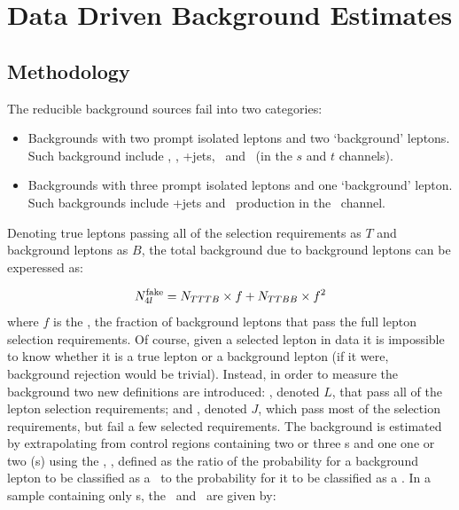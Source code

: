 \section{Data Driven Background Estimates}

\label{sec:ddbg}

\subsection{Methodology}

The reducible background sources fail into two categories:

\begin{itemize}
\item Backgrounds with two prompt isolated leptons and two `background' leptons. Such
background include \ZX, \Zgamma, \WW+jets, \ttbar\ and \singletop\ (in the
$s$ and $t$ channels).
\item Backgrounds with three prompt isolated leptons and one `background'
lepton. Such backgrounds include \WZ+jets and \singletop\ production in the \Wt\
channel.
\end{itemize}

Denoting true leptons passing all of the selection requirements as $T$ and
background leptons as $B$, the total background due to background leptons can be
experessed as:

\begin{equation}
N_{4l}^{\rm fake} = N_{TTTB} \times f + N_{TTBB} \times f^{2}
\label{eqn:bg-4l-true}
\end{equation}
where $f$ is the \frate, the fraction of background leptons that pass the full lepton selection
requirements. Of course, given a selected lepton in data it is impossible to
know whether it is a true lepton or a background lepton (if it were, background
rejection would be trivial). Instead, in order to measure the background 
two new definitions are introduced: \intro{\sellep s}, denoted $L$, that
pass all of the lepton selection requirements; and ,
denoted $J$, which
pass most of the selection requirements, but fail a few selected requirements.
The background is estimated by extrapolating from control regions containing
two or three \sellep s and one one or two \lljet (s) using the
\intro{\ffactor}, \FF, defined as the ratio of the probability for a background lepton to be
classified as a \sellep\ to the probability for it to be classified as a \lljet.
In a sample containing only \bglep s, the \frate\ and \ffactor\ are given by: 

